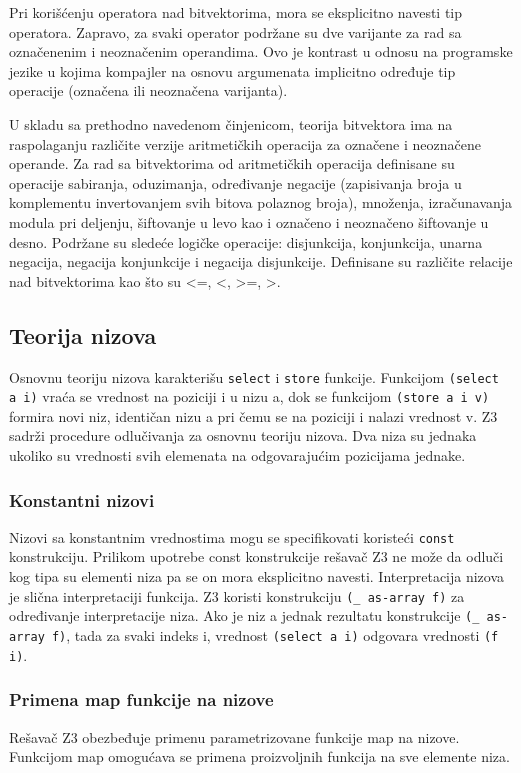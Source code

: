 \documentclass[12pt,oneside]{memoir}
\begin{document}
Pri korišćenju operatora nad bitvektorima, mora se eksplicitno navesti tip operatora. Zapravo, za svaki operator podržane su dve varijante za rad sa označenenim i neoznačenim operandima. Ovo je kontrast u odnosu na programske jezike u kojima kompajler na osnovu argumenata implicitno određuje tip operacije (označena ili neoznačena varijanta).
\par
U skladu sa prethodno navedenom činjenicom, teorija bitvektora ima na raspolaganju različite verzije aritmetičkih operacija za označene i neoznačene operande. Za rad sa bitvektorima od aritmetičkih operacija definisane su operacije sabiranja, oduzimanja, određivanje negacije (zapisivanja broja u komplementu invertovanjem svih bitova polaznog broja), množenja, izračunavanja modula pri deljenju, šiftovanje u levo kao i označeno i neoznačeno šiftovanje u desno. Podržane su sledeće logičke operacije: disjunkcija, konjunkcija, unarna negacija, negacija konjunkcije i negacija disjunkcije. Definisane su različite relacije nad bitvektorima kao što su <=, <, >=, >.



\subsection{Teorija nizova} 
Osnovnu teoriju nizova karakterišu \texttt{select} i \texttt{store} funkcije. 
Funkcijom \texttt{(select a i)} vraća se vrednost na poziciji i u nizu a, dok se funkcijom \texttt{(store a i v)} formira novi niz, identičan nizu a pri čemu se na poziciji i nalazi vrednost v.
Z3 sadrži procedure odlučivanja za osnovnu teoriju nizova.
Dva niza su jednaka ukoliko su vrednosti svih elemenata na odgovarajućim pozicijama jednake.
 

\subsubsection{Konstantni nizovi}

Nizovi sa konstantnim vrednostima mogu se specifikovati koristeći \texttt{const} konstrukciju. Prilikom upotrebe const konstrukcije rešavač Z3 ne može da odluči kog tipa su elementi niza pa se on mora eksplicitno navesti. Interpretacija nizova je slična interpretaciji funkcija. Z3 koristi konstrukciju \texttt{(\_ as-array f)} za određivanje interpretacije niza. Ako je niz a jednak rezultatu konstrukcije \texttt{(\_ as-array f)}, tada za svaki indeks i, vrednost \texttt{(select a i)} odgovara vrednosti \texttt{(f i)}. 


\subsubsection{Primena map funkcije na nizove}
Rešavač Z3 obezbeđuje primenu parametrizovane funkcije map na nizove. Funkcijom map omogućava se primena proizvoljnih funkcija na sve elemente niza.
\end{document}
